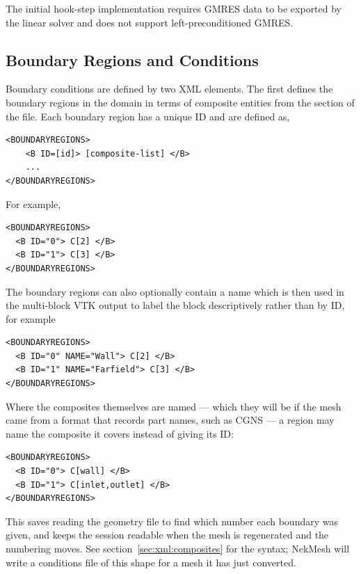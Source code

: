 The initial hook-step implementation requires GMRES data to be exported by the
linear solver and does not support left-preconditioned GMRES.

\subsection{Boundary Regions and Conditions}

Boundary conditions are defined by two XML elements. The first defines the
boundary regions in the domain in terms of composite entities from the
 section of the file. Each boundary region has a unique ID and
are defined as, 
\begin{lstlisting}[style=XMLStyle]
<BOUNDARYREGIONS>
    <B ID=[id]> [composite-list] </B>
    ...
</BOUNDARYREGIONS>
\end{lstlisting}
For example,
\begin{lstlisting}[style=XMLStyle]
<BOUNDARYREGIONS>
  <B ID="0"> C[2] </B>
  <B ID="1"> C[3] </B>
</BOUNDARYREGIONS>
\end{lstlisting}

The boundary regions can also optionally contain a name which is then used in the
multi-block VTK output to label the block descriptively rather than by ID, for
example
\begin{lstlisting}[style=XMLStyle]
<BOUNDARYREGIONS>
  <B ID="0" NAME="Wall"> C[2] </B>
  <B ID="1" NAME="Farfield"> C[3] </B>
</BOUNDARYREGIONS>
\end{lstlisting}

Where the composites themselves are named --- which they will be if the mesh
came from a format that records part names, such as CGNS --- a region may name
the composite it covers instead of giving its ID:
\begin{lstlisting}[style=XMLStyle]
<BOUNDARYREGIONS>
  <B ID="0"> C[wall] </B>
  <B ID="1"> C[inlet,outlet] </B>
</BOUNDARYREGIONS>
\end{lstlisting}
This saves reading the geometry file to find which number each boundary was
given, and keeps the session readable when the mesh is regenerated and the
numbering moves. See section~\ref{sec:xml:composites} for the syntax; NekMesh
will write a conditions file of this shape for a mesh it has just converted.

